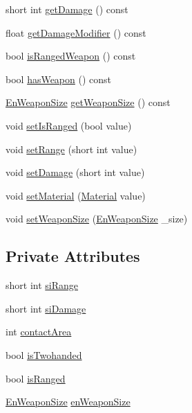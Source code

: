 \begin{DoxyCompactItemize}
\item 
short int \mbox{\hyperlink{class_weapon_adb39958d1bfe60371314991040ab04fd}{get\+Damage}} () const
\item 
float \mbox{\hyperlink{class_weapon_aa721632fc6af9548259814f4a4795757}{get\+Damage\+Modifier}} () const
\item 
bool \mbox{\hyperlink{class_weapon_a05aac2a3ad6a6b173025eb66c20de924}{is\+Ranged\+Weapon}} () const
\item 
bool \mbox{\hyperlink{class_weapon_a99c74249e561d0130575a2278a982a6c}{has\+Weapon}} () const
\item 
\mbox{\hyperlink{_weapon_8hpp_a160076f6c574c69cd1ce2b3f42cf3755}{En\+Weapon\+Size}} \mbox{\hyperlink{class_weapon_a459fd4ef8f2eefc9be73f05b6ec42bcd}{get\+Weapon\+Size}} () const
\item 
void \mbox{\hyperlink{class_weapon_a73bb6176d7e535811f30a3ee9df53b8d}{set\+Is\+Ranged}} (bool value)
\item 
void \mbox{\hyperlink{class_weapon_aa6f690fe5e69ce11628b245739c74dc5}{set\+Range}} (short int value)
\item 
void \mbox{\hyperlink{class_weapon_a0c582ba1c1413a4ecda931bb8acff458}{set\+Damage}} (short int value)
\item 
void \mbox{\hyperlink{class_weapon_a2861d732a0cccff20a9ea29548d05702}{set\+Material}} (\mbox{\hyperlink{class_material}{Material}} value)
\item 
void \mbox{\hyperlink{class_weapon_a78e4b6c131a25e93f647594191bae38d}{set\+Weapon\+Size}} (\mbox{\hyperlink{_weapon_8hpp_a160076f6c574c69cd1ce2b3f42cf3755}{En\+Weapon\+Size}} \+\_\+size)
\end{DoxyCompactItemize}
\subsection*{Private Attributes}
\begin{DoxyCompactItemize}
\item 
short int \mbox{\hyperlink{class_weapon_afb5789f93e22dfb039d273f0bd4480b0}{si\+Range}}
\item 
short int \mbox{\hyperlink{class_weapon_aedd020151d162c99d7fc5e28f627c517}{si\+Damage}}
\item 
int \mbox{\hyperlink{class_weapon_a7bdfc4c90d872b07d6dc78d9d0f4e662}{contact\+Area}}
\item 
bool \mbox{\hyperlink{class_weapon_a790c117505d8bf62c8297b3f87396070}{is\+Twohanded}}
\item 
bool \mbox{\hyperlink{class_weapon_a7e50af15bd27dfffe931e051b02101ac}{is\+Ranged}}
\item 
\mbox{\hyperlink{_weapon_8hpp_a160076f6c574c69cd1ce2b3f42cf3755}{En\+Weapon\+Size}} \mbox{\hyperlink{class_weapon_a24ad6d1a7d69604fc35d5c7f65245df4}{en\+Weapon\+Size}}
\end{DoxyCompactItemize}
